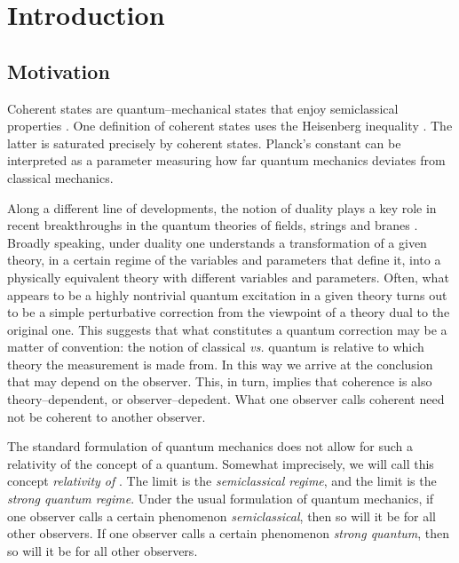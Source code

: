 \documentclass[a4paper,a4paper]{article}
\begin{document}
\tableofcontents

\section{Introduction}\label{intro}

\subsection{Motivation}\label{moti}

Coherent states are quantum--mechanical states that enjoy semiclassical 
properties \cite{COHST}. One definition of coherent states uses the Heisenberg 
inequality \coordHE{}. The latter is saturated precisely 
by coherent states. Planck's constant \myHighlight{$\hbar$}\coordHE{} can be interpreted 
as a parameter measuring how far quantum mechanics deviates from classical mechanics. 

Along a different line of developments, the notion of duality plays a key role 
in recent breakthroughs in the quantum theories of fields, strings and branes 
\cite{DUALITY, LAG, VAFA}. Broadly speaking, under duality one understands a transformation 
of a given theory, in a certain regime of the variables and parameters that define it, 
into a physically equivalent theory with different variables and parameters. 
Often, what appears to be a highly nontrivial quantum excitation in a given theory 
turns out to be a simple perturbative correction from the viewpoint 
of a theory dual to the original one. This suggests that what constitutes 
a quantum correction may be a matter of convention: the notion of classical 
{\it vs.} quantum is relative to which theory the measurement is made from.  
In this way we arrive at the conclusion that may \myHighlight{$\hbar$}\coordHE{} depend on the observer. 
This, in turn, implies that coherence is also theory--dependent, or observer--depedent.
What one observer calls coherent need not be coherent to another observer.

The standard formulation of quantum mechanics \cite{GALINDO}
does not allow for such a relativity of the concept of a quantum. 
Somewhat imprecisely, we will call this concept {\it relativity of \myHighlight{$\hbar$}\coordHE{}}. 
The limit \coordHE{} is the {\it  semiclassical regime}, and the limit \myHighlight{$\hbar\to\infty$}\coordHE{}  
is the {\it  strong quantum regime}. Under the usual formulation of quantum mechanics, 
if one observer calls a certain phenomenon {\it semiclassical}, 
then so will it be for all other observers. If one observer calls 
a certain phenomenon {\it strong quantum}, then so will it be for all other observers.
\end{document}
